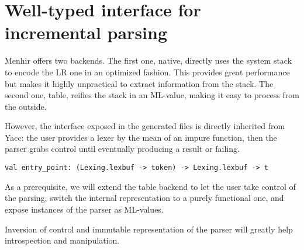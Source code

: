 \documentclass[twoside,a4paper]{article}
\begin{document}

\section{Well-typed interface for incremental parsing}



Menhir offers two backends.  The first one, native, directly uses the
system stack to encode the LR one in an optimized fashion.  This
provides great performance but makes it highly unpractical to extract
information from the stack. The second one,
  table, reifies the stack in an ML-value, making it easy to process
  from the outside.


However, the interface exposed in the generated files is directly inherited
from Yacc: the user provides a lexer by the mean of an impure function, then
the parser grabs control until eventually producing a result or failing.

\begin{lstlisting}
val entry_point: (Lexing.lexbuf -> token) -> Lexing.lexbuf -> t
\end{lstlisting}

As a prerequisite, we will extend the table backend to let the user take
control of the parsing, switch the internal representation to a purely
functional one, and expose instances of the parser as ML-values.

Inversion of control and immutable representation of the parser will greatly
help introspection and manipulation.

\end{document}
